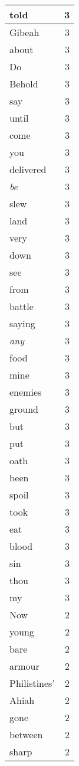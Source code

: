 \begin{center}
\begin{longtable}{l|r}
told & 3 \\ \hline
Gibeah & 3 \\ \hline
about & 3 \\ \hline
Do & 3 \\ \hline
Behold & 3 \\ \hline
say & 3 \\ \hline
until & 3 \\ \hline
come & 3 \\ \hline
you & 3 \\ \hline
delivered & 3 \\ \hline
\emph{be} & 3 \\ \hline
slew & 3 \\ \hline
land & 3 \\ \hline
very & 3 \\ \hline
down & 3 \\ \hline
see & 3 \\ \hline
from & 3 \\ \hline
battle & 3 \\ \hline
saying & 3 \\ \hline
\emph{any} & 3 \\ \hline
food & 3 \\ \hline
mine & 3 \\ \hline
enemies & 3 \\ \hline
ground & 3 \\ \hline
but & 3 \\ \hline
put & 3 \\ \hline
oath & 3 \\ \hline
been & 3 \\ \hline
spoil & 3 \\ \hline
took & 3 \\ \hline
eat & 3 \\ \hline
blood & 3 \\ \hline
sin & 3 \\ \hline
thou & 3 \\ \hline
my & 3 \\ \hline
Now & 2 \\ \hline
young & 2 \\ \hline
bare & 2 \\ \hline
armour & 2 \\ \hline
Philistines' & 2 \\ \hline
Ahiah & 2 \\ \hline
gone & 2 \\ \hline
between & 2 \\ \hline
sharp & 2 \\ \hline

\end{longtable}
\end{center}
